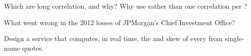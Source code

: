 \begin{interviewq}\label{iq:m2:credit-indices-and-tranches:4}
Which  are long correlation, and why? Why use  rather than
one correlation per ?
\end{interviewq}

\begin{interviewq}\label{iq:m2:credit-indices-and-tranches:5}
What went wrong in the 2012 losses of JPMorgan's Chief Investment Office?
\end{interviewq}

\begin{interviewq}\label{iq:m2:credit-indices-and-tranches:6}
Design a service that computes, in real time, the  and skew of every
 from single-name quotes.
\end{interviewq}
